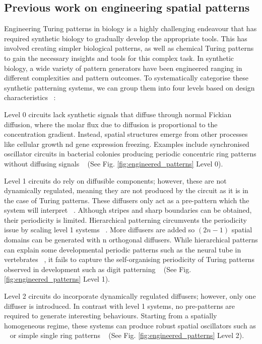 \subsection{Previous work on engineering spatial patterns}

Engineering Turing patterns in biology is a highly challenging endeavour that has required synthetic biology to gradually develop the appropriate tools.
This has involved creating simpler biological patterns, as well as chemical Turing patterns to gain the necessary insights and tools for this complex task.
In synthetic biology, a wide variety of pattern generators have been engineered ranging in different complexities and pattern outcomes.
To systematically categorise these synthetic patterning systems, we can group them into four levels based on design characteristics ~\parencite{huidobro}:

Level 0 circuits lack synthetic signals that diffuse through normal Fickian diffusion, where the molar flux due to diffusion is proportional to the concentration gradient.
Instead, spatial structures emerge from other processes like cellular growth nd gene expression freezing.
Examples include synchronised oscillator circuits in bacterial colonies producing periodic concentric ring patterns without diffusing signals ~\parencite{Potvin-Trottier2016, Riglar2019} (See Fig. \ref{fig:engineered_patterns} Level 0).

Level 1 circuits do rely on diffusible components; however, these are not dynamically regulated, meaning they are not produced by the circuit as it is in the case of Turing patterns.
These diffusers only act as a pre-pattern which the system will interpret ~\parencite{Basu2005, Schaerli2014, Kong2017, Barbier2020, Grant2020}.
Although stripes and sharp boundaries can be obtained, their periodicity is limited.
Hierarchical patterning circumvents the periodicity issue by scaling level 1 systems ~\parencite{Boehm2018}.
More diffusers are added so $(2n-1)$ spatial domains can be generated with n orthogonal diffusers.
While hierarchical patterns can explain some developmental periodic patterns such as the neural tube in vertebrates ~\parencite{Briscoe2015}, it fails to capture the self-organising periodicity of Turing patterns observed in development such as digit patterning ~\parencite{Sheth2012,Raspopovic1} (See Fig. \ref{fig:engineered_patterns} Level 1).

Level 2 circuits do incorporate dynamically regulated diffusers; however, only one diffuser is introduced.
In contrast with level 1 systems, no pre-patterns are required to generate interesting behaviours.
Starting from a spatially homogeneous regime, these systems can produce robust spatial oscillators such as ~\parencite{Danino2010} or simple single ring patterns ~\parencite{Cao2016, Payne2013} (See Fig. \ref{fig:engineered_patterns} Level 2).

